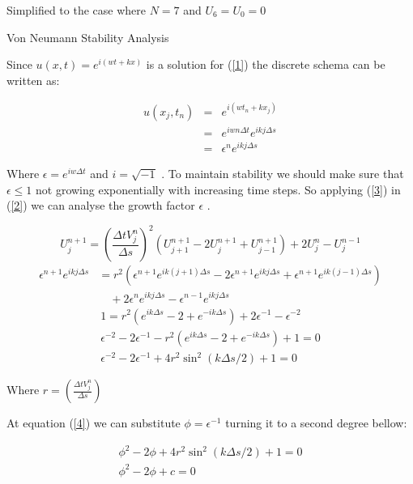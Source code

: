 \documentclass[legalpaper, 12pt]{book}
\begin{document}
Simplified to the case where $N=7$ and $ U_{6} = U_{0} = 0 $

\newpage

Von Neumann Stability Analysis

Since $ u(x,t) = e^{i(wt+kx)} $ is a solution for (\ref{1}) the discrete schema can be written as:

\begin{eqnarray}
u(x_j,t_n) &=& e^{i(wt_n+kx_j)} \nonumber \\
&=& e^{iwn\Delta t} e^{ikj\Delta s} \nonumber \\
&=& \epsilon^n e^{ikj\Delta s}
\label{3}
\end{eqnarray}


Where $\epsilon = e^{iw \Delta t} $ and $ i = \sqrt{-1} $ .
To maintain stability we should make sure that $ \epsilon \leq 1 $ not growing exponentially with increasing time steps. So applying (\ref{3}) in (\ref{2}) we can analyse the growth factor $\epsilon $ .

\begin{equation}
 U_j^{n+1}  =  \left( \frac{\Delta t  V_j^n}{\Delta s} \right) ^2 \left(  U_{j+1}^{n+1} - 2 U_j^{n+1} + U_{j-1}^{n+1}  \right) + 2 U_j^n - U_j^{n-1} \nonumber
\end{equation}
\begin{equation}
\begin{split}
\epsilon^{n+1} e^{ikj\Delta s}  &=  r^2 \left(  \epsilon^{n+1} e^{ik(j+1)\Delta s}  - 2 \epsilon^{n+1} e^{ikj\Delta s} + \epsilon^{n+1} e^{ik(j-1)\Delta s}  \right) \\
&\quad + 2 \epsilon^n e^{ikj\Delta s}  - \epsilon^{n-1} e^{ikj\Delta s} \nonumber 
\end{split}
\end{equation}
\begin{eqnarray}
 1 = r^2 (e^{ik\Delta s} -2 + e^{-ik\Delta s}) + 2 \epsilon^{-1} - \epsilon^{-2} \nonumber \\
\epsilon^{-2} - 2 \epsilon^{-1} -  r^2 (e^{ik\Delta s} -2 + e^{-ik\Delta s}) + 1 = 0  \nonumber \\
\epsilon^{-2} - 2 \epsilon^{-1} + 4 r^2 \sin^2 \left( k \Delta s / 2 \right) + 1 = 0
 \label{4}
\end{eqnarray}

Where $ r = \left( \frac{\Delta t  V_j^n}{\Delta s} \right) $

At equation (\ref{4}) we can substitute $ \phi = \epsilon^{-1} $ turning it to a second degree bellow:

\begin{eqnarray}
\phi^2 - 2 \phi +4 r^2 \sin^2 \left(k\Delta s/2 \right) +1 = 0  \nonumber \\
\phi^2 - 2 \phi + c = 0  \nonumber
\end{eqnarray}
\end{document}
